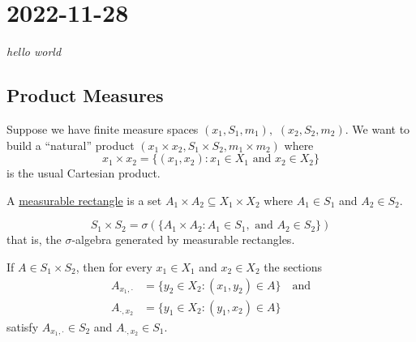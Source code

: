 \section{2022-11-28}

\epigraph{\textit{hello world}}{}

\subsection{Product Measures}

Suppose we have finite measure spaces $(x_1, S_1, m_1),$ $(x_2, S_2, m_2)$. We want to build a ``natural'' product
$(x_1 \times x_2, S_1 \times S_2, m_1 \times m_2 )$ where
\[
	x_1 \times x_2 = \{ (x_1, x_2) : x_1 \in X_1 \text{ and } x_2 \in X_2 \}
\] is the usual Cartesian product.

A \underline{measurable rectangle} is a set $A_1 \times A_2 \subseteq X_1 \times X_2$ where $A_1 \in S_1$ and $A_2 \in S_2$.

\begin{definition}
	\[
		S_1 \times S_2 = \sigma(\{ A_1 \times A_2 : A_1 \in S_1, \text{ and } A_2 \in S_2 \} )
	\] that is, the $\sigma$-algebra generated by measurable rectangles.
\end{definition}

\begin{lemma}
	If $A \in S_1 \times S_2 $, then for every $x_1 \in X_1$ and $x_2 \in X_2$ the sections
	\begin{align*}
		A_{x_1, \cdot } &= \{ y_2 \in X_2 : (x_1 , y_2 ) \in A \} \quad \text{and} \\
		A_{\cdot, x_2 } &= \{ y_1 \in X_2 : (y_1 , x_2 ) \in A \}
	\end{align*} satisfy $A_{x_1 , \cdot} \in S_2$ and $A_{\cdot, x_2} \in S_1$.
\end{lemma}

